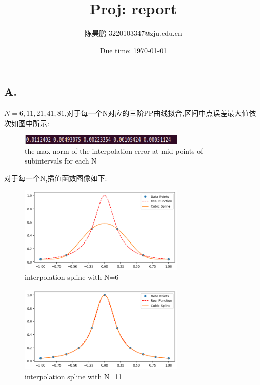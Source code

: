 \documentclass[a4paper]{article}
\begin{document}
\title{Proj: report}

\author{陈昊鹏  3220103347@zju.edu.cn}


\date{Due time: \today}

\maketitle
\subsection*{A.}
$N=6,11,21,41,81$,对于每一个N对应的三阶PP曲线拟合,区间中点误差最大值依次如图中所示:
\begin{figure}[H]
    \centering
    \includegraphics[width=0.7\textwidth]{A.png}
    \caption{the max-norm of the interpolation error at mid-points of subintervals for each N}
    \label{Fig}
\end{figure}
对于每一个N,插值函数图像如下:
\begin{figure}[H]
    \centering
    \includegraphics[width=0.7\textwidth]{N=6.png}
    \caption{interpolation spline with N=6}
    \label{Fig}
\end{figure}
\begin{figure}[H]
    \centering
    \includegraphics[width=0.7\textwidth]{N=11.png}
    \caption{interpolation spline with N=11}
    \label{Fig}
\end{figure}
\end{document}
